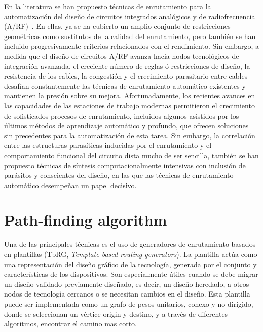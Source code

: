 \documentclass[reprint,amsmath,amssymb,aps]{revtex4-2}
\begin{document}
En la literatura se han propuesto técnicas de enrutamiento para la automatización del diseño de circuitos integrados analógicos y de radiofrecuencia (A/RF)~\cite{unutulmaz, martins}. En ellas, ya se ha cubierto un amplio conjunto de restricciones geométricas como sustitutos de la calidad del enrutamiento, pero también se han incluido progresivamente criterios relacionados con el rendimiento. Sin embargo, a medida que el diseño de circuitos A/RF avanza hacia nodos tecnológicos de integración avanzada, el creciente número de reglas ó restricciones de diseño, la resistencia de los cables, la congestión y el crecimiento parasitario entre cables desafían constantemente las técnicas de enrutamiento automático existentes y mantienen la presión sobre su mejora. Afortunadamente, los recientes avances en las capacidades de las estaciones de trabajo modernas permitieron el crecimiento de sofisticados procesos de enrutamiento, incluidos algunos asistidos por los últimos métodos de aprendizaje automático y profundo, que ofrecen soluciones sin precedentes para la automatización de esta tarea. Sin embargo, la correlación entre las estructuras parasíticas inducidas por el enrutamiento y el comportamiento funcional del circuito dista mucho de ser sencilla, también se han propuesto técnicas de síntesis computacionalmente intensivas con inclusión de parásitos y conscientes del diseño, en las que las técnicas de enrutamiento automático desempeñan un papel decisivo.\\

\section{Path-finding algorithm}

Una de las principales técnicas es el uso de generadores de enrutamiento basados en plantillas (TbRG, \textit{Template-based routing generators}). La plantilla actúa como una representación del diseño gráfico de la tecnología, generada por el conjunto y características de los dispositivos. Son especialmente útiles cuando se debe migrar un diseño validado previamente diseñado, es decir, un diseño heredado, a otros nodos de tecnología cercanos o se necesitan cambios en el diseño. Esta plantilla puede ser implementada como un grafo de pesos unitarios, conexo y no dirigido, donde se seleccionan un vértice origin y destino, y a través de diferentes algoritmos, encontrar el camino mas corto.
\end{document}
